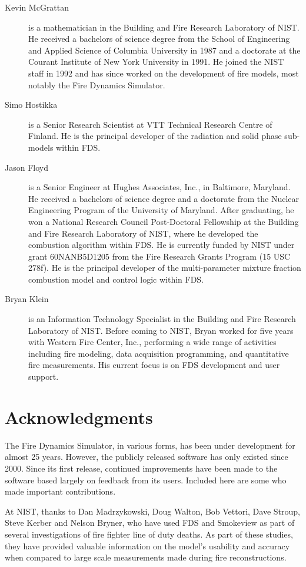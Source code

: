 \documentclass[11pt]{book}
\begin{document}
\begin{description}
\item[Kevin McGrattan] is a mathematician in the Building and Fire
Research Laboratory of NIST. He received a bachelors of science degree
from the School of Engineering and Applied Science of Columbia
University in 1987 and a doctorate at the Courant Institute of New
York University in 1991. He joined the NIST staff in 1992 and has
since worked on the development of fire models, most notably the Fire
Dynamics Simulator.
\item[Simo Hostikka] is a Senior Research Scientist at VTT Technical
Research Centre of Finland.  He is the principal developer of the
radiation and solid phase sub-models within FDS.
\item[Jason Floyd] is a Senior Engineer at Hughes Associates, Inc., in
Baltimore, Maryland. He received a bachelors of science degree and a
doctorate from the Nuclear Engineering Program of the University of
Maryland. After graduating, he won a National Research Council
Post-Doctoral Fellowship at the Building and Fire Research Laboratory
of NIST, where he developed the combustion algorithm within FDS. He is
currently funded by NIST under grant 60NANB5D1205 from the Fire
Research Grants Program (15 USC 278f).  He is the principal developer
of the multi-parameter mixture fraction combustion model and control
logic within FDS.
\item[Bryan Klein] is an Information Technology Specialist in the
Building and Fire Research Laboratory of NIST.  Before coming to NIST,
Bryan worked for five years with Western Fire Center, Inc., performing a
wide range of activities including fire modeling, data acquisition programming,
and quantitative fire measurements. His current focus is on FDS development and
user support.
\end{description}



\chapter{Acknowledgments}

The Fire Dynamics Simulator, in various forms, has been under development for almost 25 years. However,
the publicly released software has only existed since 2000. Since its first release, continued improvements
have been made to the software based largely on feedback from its users.
Included here are some who made important contributions.

At NIST, thanks to Dan Madrzykowski, Doug Walton, Bob Vettori, Dave Stroup, Steve Kerber and Nelson Bryner,
who have used FDS and Smokeview as part of several investigations of fire fighter line of duty deaths.
As part of these studies, they have provided valuable information on the model's usability and accuracy
when compared to large scale measurements made during fire reconstructions.
\end{document}
